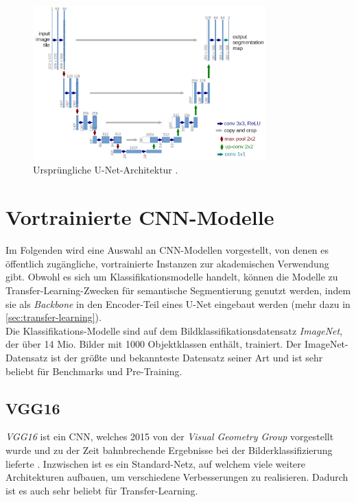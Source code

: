 \begin{figure}
	\centering
	\includegraphics[width=0.8\textwidth]{Bilder/u-net-architecture.png} 
	\caption{Ursprüngliche U-Net-Architektur \cite{Ronneberger.18052015}.}
	\label{fig:u-net-architecture}
\end{figure} 

\section{Vortrainierte \ac{CNN}-Modelle} \label{sec:pretrained-backbones}

Im Folgenden wird eine Auswahl an \ac{CNN}-Modellen vorgestellt, von denen es öffentlich zugängliche,
vortrainierte Instanzen zur akademischen Verwendung gibt. Obwohl es sich um Klassifikationsmodelle handelt,
können die Modelle zu Transfer-Learning-Zwecken für semantische Segmentierung
genutzt werden, indem sie als \textit{Backbone} in den Encoder-Teil eines U-Net eingebaut werden 
(mehr dazu in \autoref{sec:transfer-learning}). \\ 
Die Klassifikations-Modelle sind auf dem Bildklassifikationsdatensatz \textit{ImageNet}, der über 14 Mio. Bilder 
mit 1000 Objektklassen enthält, trainiert. Der ImageNet-Datensatz ist der größte und bekannteste 
Datensatz seiner Art und ist sehr beliebt für Benchmarks und Pre-Training.

\subsection{VGG16} \label{sec:pretrained-backbones:vgg16}

\textit{VGG16} ist ein \ac{CNN}, welches 2015 von der \textit{Visual Geometry Group} vorgestellt wurde 
und zu der Zeit bahnbrechende Ergebnisse bei der Bilderklassifizierung lieferte \cite{Simonyan.04092014}. 
Inzwischen ist es ein Standard-Netz, auf welchem viele weitere Architekturen aufbauen,
um verschiedene Verbesserungen zu realisieren. 
Dadurch ist es auch sehr beliebt für Transfer-Learning. 

